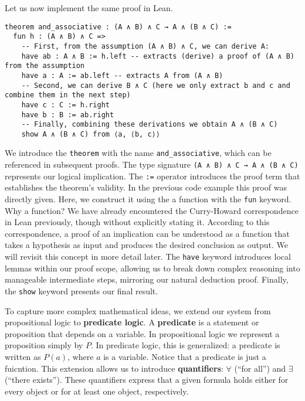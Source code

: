 \begin{example}
Let us now implement the same proof in Lean.
\begin{lstlisting}[language=Lean, caption=Associativity of Conjunction in Lean]
theorem and_associative : (A ∧ B) ∧ C → A ∧ (B ∧ C) :=
  fun h : (A ∧ B) ∧ C =>
    -- First, from the assumption (A ∧ B) ∧ C, we can derive A:
    have ab : A ∧ B := h.left -- extracts (derive) a proof of (A ∧ B) from the assumption
    have a : A := ab.left -- extracts A from (A ∧ B)
    -- Second, we can derive B ∧ C (here we only extract b and c and combine them in the next step) 
    have c : C := h.right
    have b : B := ab.right
    -- Finally, combining these derivations we obtain A ∧ (B ∧ C)
    show A ∧ (B ∧ C) from ⟨a, ⟨b, c⟩⟩
\end{lstlisting}
We introduce the \lstinline[language=lean]|theorem| with the name 
\lstinline[language=lean]|and_associative|, 
which can be referenced in subsequent proofs. 
The type signature \lstinline[language=lean]|(A ∧ B) ∧ C → A ∧ (B ∧ C)| 
represents our logical implication.
The \lstinline[language=lean]|:=| operator introduces the 
proof term that establishes the theorem's validity. 
In the previous code example this proof was directly given.
Here, we construct it using the a function with the \lstinline[language=lean]|fun| keyword. 
Why a function? We have already encountered the Curry-Howard correspondence in Lean 
previously, though without explicitly stating it. 
According to this correspondence, a proof of an implication can be 
understood as a function that takes a hypothesis as input and produces 
the desired conclusion as output. We will revisit this concept in more 
detail later.
The \lstinline[language=lean]|have| keyword introduces local 
lemmas within our proof scope, allowing us to break down complex 
reasoning into manageable intermediate steps, mirroring our natural deduction proof.
Finally, the \lstinline[language=lean]|show| keyword presents our final result. 
\end{example}

To capture more complex mathematical ideas, we extend our system from 
propositional logic to \textbf{predicate logic}.  
A \textbf{predicate} is a statement or proposition that depends on a variable.
In propositional logic we represent a proposition simply by $P$.  
In predicate logic, this is generalized: a predicate is written as $P(a)$, 
where $a$ is a variable. Notice that a predicate is just a fuicntion.
This extension allows us to introduce \textbf{quantifiers}:  
$\forall$ (``for all'') and $\exists$ (``there exists'').  
These quantifiers express that a given formula holds either for every object 
or for at least one object, respectively.

